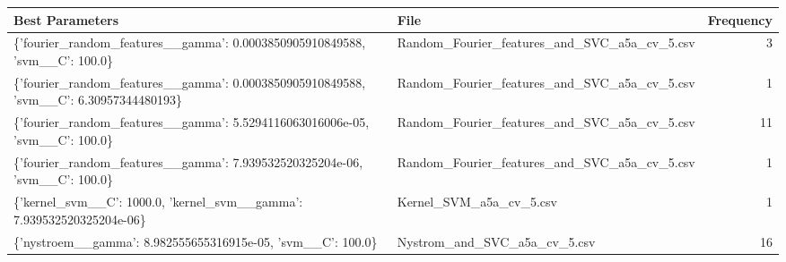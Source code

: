 \begin{tabularx}{\textwidth}{llr}
\toprule
                                                                      Best Parameters &                                         File &  Frequency \\
\midrule
           \{'fourier\_random\_features\_\_gamma': 0.0003850905910849588, 'svm\_\_C': 100.0\} & Random\_Fourier\_features\_and\_SVC\_a5a\_cv\_5.csv &          3 \\
\{'fourier\_random\_features\_\_gamma': 0.0003850905910849588, 'svm\_\_C': 6.30957344480193\} & Random\_Fourier\_features\_and\_SVC\_a5a\_cv\_5.csv &          1 \\
          \{'fourier\_random\_features\_\_gamma': 5.5294116063016006e-05, 'svm\_\_C': 100.0\} & Random\_Fourier\_features\_and\_SVC\_a5a\_cv\_5.csv &         11 \\
           \{'fourier\_random\_features\_\_gamma': 7.939532520325204e-06, 'svm\_\_C': 100.0\} & Random\_Fourier\_features\_and\_SVC\_a5a\_cv\_5.csv &          1 \\
                \{'kernel\_svm\_\_C': 1000.0, 'kernel\_svm\_\_gamma': 7.939532520325204e-06\} &                      Kernel\_SVM\_a5a\_cv\_5.csv &          1 \\
                          \{'nystroem\_\_gamma': 8.982555655316915e-05, 'svm\_\_C': 100.0\} &                 Nystrom\_and\_SVC\_a5a\_cv\_5.csv &         16 \\
\bottomrule
\end{tabularx}
